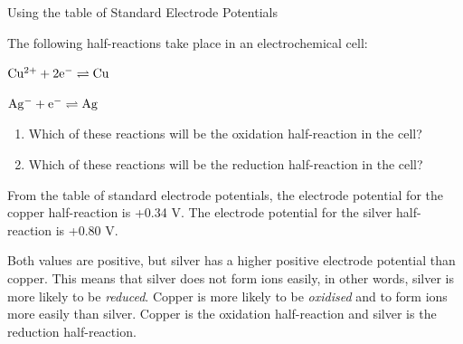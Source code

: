 \begin{wex}{Using the table of Standard Electrode Potentials\\}{

The following half-reactions take place in an electrochemical cell:

$\rm{Cu^{2+} + 2e^{-} \rightleftharpoons Cu}$

$\rm{Ag^{-} + e^{-} \rightleftharpoons Ag}$\\

	\begin{enumerate}
	\item{Which of these reactions will be the oxidation half-reaction in the cell?}
	\item{Which of these reactions will be the reduction half-reaction in the cell?}
	\end{enumerate}
}
{

From the table of standard electrode potentials, the electrode potential for the copper half-reaction is +0.34 V. The electrode potential for the silver half-reaction is +0.80 V.\\


Both values are positive, but silver has a higher positive electrode potential than copper. This means that silver does not form ions easily, in other words, silver is more likely to be \textit{reduced}. Copper is more likely to be \textit{oxidised} and to form ions more easily than silver. Copper is the oxidation half-reaction and silver is the reduction half-reaction.
}
\end{wex}


